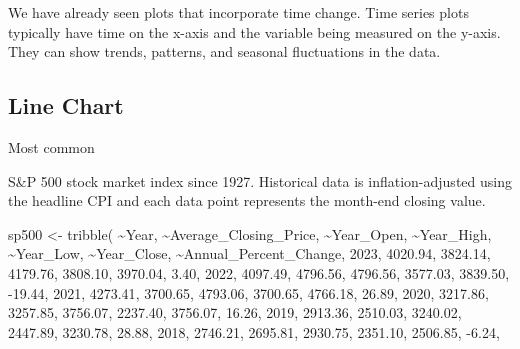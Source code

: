 \documentclass[
  letterpaper,
]{book}
\newenvironment{Shaded}{\begin{snugshade}}{\end{snugshade}}
\newcommand{\DecValTok}[1]{\textcolor[rgb]{0.68,0.00,0.00}{#1}}
\newcommand{\FloatTok}[1]{\textcolor[rgb]{0.68,0.00,0.00}{#1}}
\newcommand{\FunctionTok}[1]{\textcolor[rgb]{0.28,0.35,0.67}{#1}}
\newcommand{\NormalTok}[1]{\textcolor[rgb]{0.00,0.23,0.31}{#1}}
\newcommand{\OtherTok}[1]{\textcolor[rgb]{0.00,0.23,0.31}{#1}}
\newcommand{\SpecialCharTok}[1]{\textcolor[rgb]{0.37,0.37,0.37}{#1}}
\begin{document}
We have already seen plots that incorporate time change. Time series
plots typically have time on the x-axis and the variable being measured
on the y-axis. They can show trends, patterns, and seasonal fluctuations
in the data.

\hypertarget{line-chart}{%
\subsection{Line Chart}\label{line-chart}}

Most common

S\&P 500 stock market index since 1927. Historical data is
inflation-adjusted using the headline CPI and each data point represents
the month-end closing value.

\begin{Shaded}
\begin{Highlighting}[]
\NormalTok{sp500 }\OtherTok{\textless{}{-}} \FunctionTok{tribble}\NormalTok{(}
  \SpecialCharTok{\textasciitilde{}}\NormalTok{Year, }\SpecialCharTok{\textasciitilde{}}\NormalTok{Average\_Closing\_Price, }\SpecialCharTok{\textasciitilde{}}\NormalTok{Year\_Open, }\SpecialCharTok{\textasciitilde{}}\NormalTok{Year\_High, }\SpecialCharTok{\textasciitilde{}}\NormalTok{Year\_Low, }\SpecialCharTok{\textasciitilde{}}\NormalTok{Year\_Close, }\SpecialCharTok{\textasciitilde{}}\NormalTok{Annual\_Percent\_Change,}
  \DecValTok{2023}\NormalTok{, }\FloatTok{4020.94}\NormalTok{, }\FloatTok{3824.14}\NormalTok{, }\FloatTok{4179.76}\NormalTok{, }\FloatTok{3808.10}\NormalTok{, }\FloatTok{3970.04}\NormalTok{, }\FloatTok{3.40}\NormalTok{,}
  \DecValTok{2022}\NormalTok{, }\FloatTok{4097.49}\NormalTok{, }\FloatTok{4796.56}\NormalTok{, }\FloatTok{4796.56}\NormalTok{, }\FloatTok{3577.03}\NormalTok{, }\FloatTok{3839.50}\NormalTok{, }\SpecialCharTok{{-}}\FloatTok{19.44}\NormalTok{,}
  \DecValTok{2021}\NormalTok{, }\FloatTok{4273.41}\NormalTok{, }\FloatTok{3700.65}\NormalTok{, }\FloatTok{4793.06}\NormalTok{, }\FloatTok{3700.65}\NormalTok{, }\FloatTok{4766.18}\NormalTok{, }\FloatTok{26.89}\NormalTok{,}
  \DecValTok{2020}\NormalTok{, }\FloatTok{3217.86}\NormalTok{, }\FloatTok{3257.85}\NormalTok{, }\FloatTok{3756.07}\NormalTok{, }\FloatTok{2237.40}\NormalTok{, }\FloatTok{3756.07}\NormalTok{, }\FloatTok{16.26}\NormalTok{,}
  \DecValTok{2019}\NormalTok{, }\FloatTok{2913.36}\NormalTok{, }\FloatTok{2510.03}\NormalTok{, }\FloatTok{3240.02}\NormalTok{, }\FloatTok{2447.89}\NormalTok{, }\FloatTok{3230.78}\NormalTok{, }\FloatTok{28.88}\NormalTok{,}
  \DecValTok{2018}\NormalTok{, }\FloatTok{2746.21}\NormalTok{, }\FloatTok{2695.81}\NormalTok{, }\FloatTok{2930.75}\NormalTok{, }\FloatTok{2351.10}\NormalTok{, }\FloatTok{2506.85}\NormalTok{, }\SpecialCharTok{{-}}\FloatTok{6.24}\NormalTok{,}

\end{Highlighting}
\end{Shaded}
\end{document}
